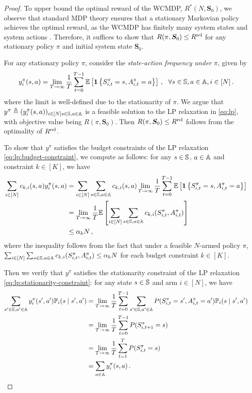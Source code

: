 \lprelaxation*


\begin{proof}
To upper bound the optimal reward of the WCMDP, $R^*(N,\bm{S}_0)$, we observe that standard MDP theory ensures that a stationary Markovian policy achieves the optimal reward, as the WCMDP has finitely many system states and system actions \citep[Theorem 9.18]{Put_05}. 
Therefore, it suffices to show that $R(\pi,\bm{S}_0) \leq R^{\textup{rel}}$ for any stationary policy $\pi$ and initial system state $\bm{S}_0$. 

For any stationary policy $\pi$, consider the \emph{state-action frequency under $\pi$}, given by  
\begin{align*}
    y^\pi_i(s,a) = \lim_{T\to\infty} \frac{1}{T} \sum_{t=0}^{T-1} \mathbb{E}\left[\mathbf{1}\left\{ S_{i,t}^\pi=s,A_{i,t}^\pi=a \right\}\right]\,,~~\forall s\in\mathbb{S}, a\in\mathbb{A}, i\in[N]\,.
\end{align*}
where the limit is well-defined due to the stationarity of $\pi$. 
We argue that $y^\pi\triangleq (y_i^\pi(s,a))_{i\in[N] s\in\mathbb{S}, a\in\mathbb{A}}$ is a feasible solution to the LP relaxation in \eqref{eq:lp}, with objective value being $R(\pi, \bm{S}_0)$. Then $R(\pi,\bm{S}_0) \leq R^{\textup{rel}}$ follows from the optimality of $R^{\textup{rel}}$. 

To show that $y^\pi$ satisfies the budget constraints of the LP relaxation \eqref{eq:lp:budget-constraint}, we compute as follows: for any $s\in\mathbb{S}$, $a\in\mathbb{A}$ and constraint $k\in [K]$, we have
\begin{align*}
    \sum_{i\in[N]} c_{k,i}(s,a) y^\pi_i(s,a) 
    &= \sum_{i\in[N]} \sum_{s\in\mathbb{S},a\in\mathbb{A}} c_{k,i}(s,a) \lim_{T\to\infty} \frac{1}{T} \sum_{t=0}^{T-1}\mathbb{E}\left[\mathbf{1}\left\{ S_{i,t}^\pi=s,A_{i,t}^\pi=a \right\}\right]\\
    &= \lim_{T\to\infty} \frac{1}{T}\mathbb{E}\left[ \sum_{i\in[N]}\sum_{s\in\mathbb{S},a\in\mathbb{A}}c_{k,i}(S_{i,t}^\pi,A_{i,t}^\pi)\right]\\
    &\leq \alpha_k N\,,
\end{align*}
where the inequality follows from the fact that  under a feasible $N$-armed policy $\pi$, $\sum_{i\in[N]}\sum_{s\in\mathbb{S},a\in\mathbb{A}} c_{k,i}(S_{i,t}^\pi,A_{i,t}^\pi) \leq \alpha_k N$ for each budget constraint $k\in[K]$.

Then we verify that $y^\pi$ satisfies the stationarity constraint of the LP relaxation \eqref{eq:lp:stationarity-constraint}: for any state $s\in\mathbb{S}$ and arm $i\in[N]$, we have
\begin{align*}
    \sum_{s'\in\mathbb{S},a'\in\mathbb{A}}y_i^\pi(s',a')\mathbb{P}_i(s \mid s',a')&=\lim_{T\to\infty}\frac{1}{T} \sum_{t=0}^{T-1} \sum_{s'\in\mathbb{S},a'\in\mathbb{A}}P(S_{i,t}^\pi=s',A_{i,t}^\pi=a')\mathbb{P}_i(s\mid s',a')\\
    &=\lim_{T\to\infty} \frac{1}{T} \sum_{t=0}^{T-1}P(S_{i,t+1}^\pi=s) \\
    &= \lim_{T\to\infty} \frac{1}{T} \sum_{t=1}^T P(S_{i,t}^\pi=s)\\
    &= \sum_{a\in\mathbb{A}} y^\pi_i(s,a)\,.
\end{align*}



\end{proof}
